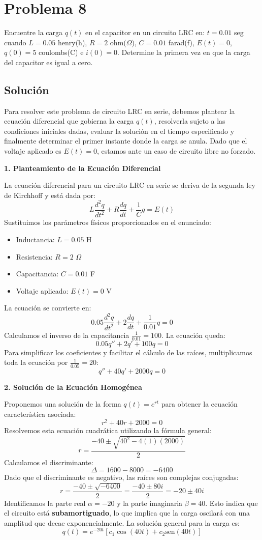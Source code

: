 \documentclass[a4paper]{article}
\begin{document}
\section{Problema 8}
Encuentre la carga $q(t)$ en el capacitor en un circuito LRC en: $t= 0.01$ seg cuando $L= 0.05$ henry(h), $R= 2$ ohm($\Omega$), $C= 0.01$ farad(f), $E(t)= 0$, $q(0)= 5$ coulombs(C) e $i(0)= 0$. Determine la primera vez en que la carga del capacitor es igual a cero.

\subsection{Solución}
Para resolver este problema de circuito LRC en serie, debemos plantear la ecuación diferencial que gobierna la carga $q(t)$, resolverla sujeto a las condiciones iniciales dadas, evaluar la solución en el tiempo especificado y finalmente determinar el primer instante donde la carga se anula. Dado que el voltaje aplicado es $E(t) = 0$, estamos ante un caso de circuito libre no forzado.

\textbf{1. Planteamiento de la Ecuación Diferencial}

La ecuación diferencial para un circuito LRC en serie se deriva de la segunda ley de Kirchhoff y está dada por:
$$
L\frac{d^2q}{dt^2} + R\frac{dq}{dt} + \frac{1}{C}q = E(t)
$$
Sustituimos los parámetros físicos proporcionados en el enunciado:
\begin{itemize}
    \item Inductancia: $L = 0.05$ H
    \item Resistencia: $R = 2$ $\Omega$
    \item Capacitancia: $C = 0.01$ F
    \item Voltaje aplicado: $E(t) = 0$ V
\end{itemize}

La ecuación se convierte en:
$$
0.05\frac{d^2q}{dt^2} + 2\frac{dq}{dt} + \frac{1}{0.01}q = 0
$$
Calculamos el inverso de la capacitancia $\frac{1}{0.01} = 100$. La ecuación queda:
$$
0.05 q'' + 2 q' + 100 q = 0
$$
Para simplificar los coeficientes y facilitar el cálculo de las raíces, multiplicamos toda la ecuación por $\frac{1}{0.05} = 20$:
$$
q'' + 40 q' + 2000 q = 0
$$

\textbf{2. Solución de la Ecuación Homogénea}

Proponemos una solución de la forma $q(t) = e^{rt}$ para obtener la ecuación característica asociada:
$$
r^2 + 40r + 2000 = 0
$$
Resolvemos esta ecuación cuadrática utilizando la fórmula general:
$$
r = \frac{-40 \pm \sqrt{40^2 - 4(1)(2000)}}{2}
$$
Calculamos el discriminante:
$$
\Delta = 1600 - 8000 = -6400
$$
Dado que el discriminante es negativo, las raíces son complejas conjugadas:
$$
r = \frac{-40 \pm \sqrt{-6400}}{2} = \frac{-40 \pm 80i}{2} = -20 \pm 40i
$$
Identificamos la parte real $\alpha = -20$ y la parte imaginaria $\beta = 40$. Esto indica que el circuito está \textbf{subamortiguado}, lo que implica que la carga oscilará con una amplitud que decae exponencialmente. La solución general para la carga es:
$$
q(t) = e^{-20t} [c_1 \cos(40t) + c_2 \text{sen}(40t)]
$$
\end{document}
